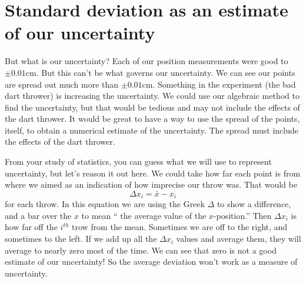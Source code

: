 \documentclass[twoside,11pt,ShortChapTitles]{BYUTextbook}
\begin{document}
\section{Standard deviation as an estimate of our uncertainty}

But what is our uncertainty? Each of our position measurements were good to $%
\pm 0.01\text{cm}.$ But this can't be what governs our uncertainty. We can
see our points are spread out much more than $\pm 0.01\text{cm}.$ Something
in the experiment (the bad dart thrower) is increasing the uncertainty. We
could use our algebraic method to find the uncertainty, but that would be
tedious and may not include the effects of the dart thrower. It would be
great to have a way to use the spread of the points, itself, to obtain a
numerical estimate of the uncertainty. The spread must include the effects
of the dart thrower.

From your study of statistics, you can guess what we will use to represent
uncertainty, but let's reason it out here. We could take how far each point
is from where we aimed as an indication of how imprecise our throw was. That
would be
\[
\Delta x_{i}=\bar{x}-x_{i}
\]%
for each throw. In this equation we are using the Greek $\Delta $ to show a
difference, and a bar over the $x$ to mean `` the average
value of the $x$-position.'' Then $\Delta x_{i}$ is how far
off the $i^{th}$ trow from the mean. Sometimes we are off to the right, and
sometimes to the left. If we add up all the $\Delta x_{i}$ values and
average them, they will average to nearly zero most of the time. We can see
that zero is not a good estimate of our uncertainty! So the average
deviation won't work as a measure of uncertainty.
\end{document}
